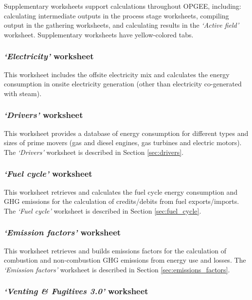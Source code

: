 \documentclass[11pt]{report}
\newcommand{\sheet}[1]{\textit{`{#1}'}}
\begin{document}
Supplementary worksheets support calculations throughout OPGEE, including: calculating intermediate outputs in the process stage worksheets, compiling output in the gathering worksheets, and calculating results in the \sheet{Active field} worksheet. Supplementary worksheets have yellow-colored tabs.

\subsubsection{\sheet{Electricity} worksheet}

This worksheet includes the offsite electricity mix and calculates the energy consumption in onsite electricity generation (other than electricity co-generated with steam).

\subsubsection{\sheet{Drivers} worksheet} 

This worksheet provides a database of energy consumption for different types and sizes of prime movers (gas and diesel engines, gas turbines and electric motors). The \sheet{Drivers} worksheet is described in Section \ref{sec:drivers}.

\subsubsection{\sheet{Fuel cycle} worksheet}

This worksheet retrieves and calculates the fuel cycle energy consumption and GHG emissions for the calculation of credits/debits from fuel exports/imports. The \sheet{Fuel cycle} worksheet is described in Section \ref{sec:fuel_cycle}.

\subsubsection{\sheet{Emission factors} worksheet} 

This worksheet retrieves and builds emissions factors for the calculation of combustion and non-combustion GHG emissions from energy use and losses. The \sheet{Emission factors} worksheet is described in Section \ref{sec:emissions_factors}.

\subsubsection{\sheet{Venting \& Fugitives 3.0} worksheet} 
\end{document}
